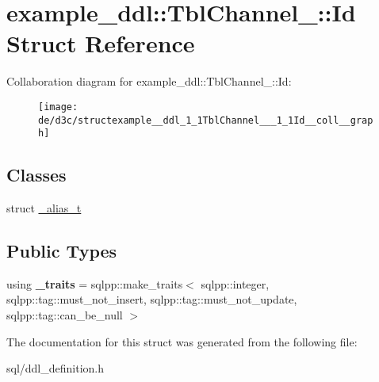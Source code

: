 \hypertarget{structexample__ddl_1_1TblChannel___1_1Id}{}\section{example\+\_\+ddl\+:\+:Tbl\+Channel\+\_\+\+:\+:Id Struct Reference}
\label{structexample__ddl_1_1TblChannel___1_1Id}


Collaboration diagram for example\+\_\+ddl\+:\+:Tbl\+Channel\+\_\+\+:\+:Id\+:
\nopagebreak
\begin{figure}[H]
\begin{center}
\leavevmode
\texttt{[image: de/d3c/structexample\_\_ddl\_1\_1TblChannel\_\_\_1\_1Id\_\_coll\_\_graph]}
\end{center}
\end{figure}
\subsection*{Classes}
\begin{DoxyCompactItemize}
\item 
struct \hyperlink{structexample__ddl_1_1TblChannel___1_1Id_1_1__alias__t}{\+\_\+alias\+\_\+t}
\end{DoxyCompactItemize}
\subsection*{Public Types}
\begin{DoxyCompactItemize}
\item 
\hypertarget{structexample__ddl_1_1TblChannel___1_1Id_a729469042959a1222b3ecdcae3d785f1}{}using {\bfseries \+\_\+traits} = sqlpp\+::make\+\_\+traits$<$ sqlpp\+::integer, sqlpp\+::tag\+::must\+\_\+not\+\_\+insert, sqlpp\+::tag\+::must\+\_\+not\+\_\+update, sqlpp\+::tag\+::can\+\_\+be\+\_\+null $>$\label{structexample__ddl_1_1TblChannel___1_1Id_a729469042959a1222b3ecdcae3d785f1}

\end{DoxyCompactItemize}


The documentation for this struct was generated from the following file\+:\begin{DoxyCompactItemize}
\item 
sql/ddl\+\_\+definition.\+h\end{DoxyCompactItemize}

